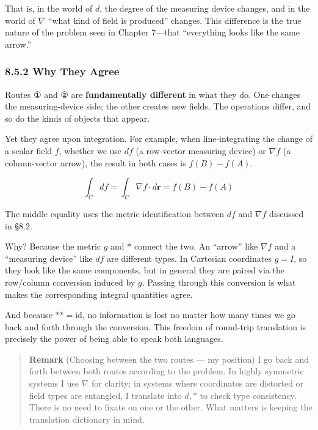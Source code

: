 \documentclass[a4paper,12pt,openany]{book}
\begin{document}
That is, in the world of \(d\), the degree of the measuring device
changes, and in the world of \(\nabla\) ``what kind of field is
produced'' changes. This difference is the true nature of the problem
seen in Chapter 7—that ``everything looks like the same arrow.''

\hypertarget{why-they-agree}{%
\subsubsection{8.5.2 Why They Agree}\label{why-they-agree}}

Routes ① and ② are \textbf{fundamentally different} in what they do. One
changes the measuring-device side; the other creates new fields. The
operations differ, and so do the kinds of objects that appear.

Yet they agree upon integration. For example, when line-integrating the
change of a scalar field \(f\), whether we use \(df\) (a row-vector
measuring device) or \(\nabla f\) (a column-vector arrow), the result in
both cases is \(f(B)-f(A)\).

\[\int_C df = \int_C \nabla f \cdot d\mathbf{r} = f(B) - f(A)\]

The middle equality uses the metric identification between \(df\) and
\(\nabla f\) discussed in §8.2.

Why? Because the metric \(g\) and \(\ast\) connect the two. An ``arrow''
like \(\nabla f\) and a ``measuring device'' like \(df\) are different
types. In Cartesian coordinates \(g=I\), so they look like the same
components, but in general they are paired via the row/column conversion
induced by \(g\). Passing through this conversion is what makes the
corresponding integral quantities agree.

And because \(\ast\ast = \mathrm{id}\), no information is lost no matter
how many times we go back and forth through the conversion. This freedom
of round-trip translation is precisely the power of being able to speak
both languages.

\begin{quote}
\textbf{Remark} (Choosing between the two routes — my position) I go
back and forth between both routes according to the problem. In highly
symmetric systems I use \(\nabla\) for clarity; in systems where
coordinates are distorted or field types are entangled, I translate into
\(d,\ast\) to check type consistency. There is no need to fixate on one
or the other. What matters is keeping the translation dictionary in
mind.
\end{quote}
\end{document}
